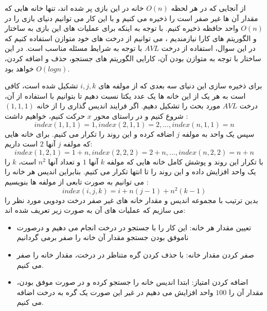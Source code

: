\documentclass[]{article}
\begin{document}
از آنجایی که در هر لحظه $O(n)$ خانه در این بازی پر شده اند،
تنها خانه هایی که مقدار آن ها غیر صفر است را ذخیره می کنیم و با این کار می توانیم
دنیای بازی را در $O(n)$ واحد حافظه ذخیره کنیم.
با توجه به اینکه برای عملیات های این بازی به ساختار و الگوریتم های کارا نیازمندیم ، می توانیم از
درخت های خود متوازن استفاده کنیم که در این سوال، استفاده از درخت $AVL$
با توجه به شرایط مسئله مناسب است.
در این ساختار با توجه به متوازن بودن آن، کارایی الگوریتم های جستجو، حذف و اضافه کردن،
$O(logn)$
خواهد بود.

برای ذخیره سازی این دنیای سه بعدی که از مولفه های $i, j, k$ تشکیل شده است،
کافی است به هر یک از این خانه ها یک عدد یکتا نسبت دهیم تا بتوانیم با استفاده از آن، درخت $AVL$
مورد بحث را تشکیل دهیم.
اگر فرایند اندیس گذاری را از خانه $(1,1,1)$ شروع کنیم و در راستای محور $x$ حرکت کنیم،
خواهیم داشت :
$$
index(1,1,1) = 1, index(2, 1, 1) = 2, ..., index(n, 1, 1) = n
$$
سپس یک واحد به مولفه $j$ اضافه کرده و این روند را تکرار می کنیم.
برای خانه هایی که مولفه $j$ آنها $2$ است داریم:
$$
index(1,2,1) = 1 + n, index(2, 2, 2) = 2 + n, \ldots, index(n, 2, 2) = n + n
$$
با تکرار این روند و پوشش کامل خانه هایی که مولفه $k$ آنها $1$ و تعداد آنها $n^2$ است،
$k$ را یک واحد افزایش داده و این روند را تا انتها تکرار می کنیم.
بنابراین اندیس هر خانه را می توانیم به صورت تابعی از مولفه ها بنویسیم :
$$index(i, j, k) = i + n(j-1) + n^2(k-1)$$
بدین ترتیب با مجموعه اندیس و مقدار خانه های غیر صفر درخت دودویی مورد نظر را می سازیم که عملیات های آن
به صورت زیر تعریف شده اند:
\begin{itemize}
    \item {
        تعیین مقدار هر خانه: این کار را با جستجو در درخت انجام می دهیم و درصورت
        ناموفق بودن جستجو مقدار آن خانه را صفر برمی گردانیم
    }
    \item {
        صفر کردن مقدار خانه:
        با حذف کردن گره متناظر در درخت، مقدار خانه را صفر می کنیم.
    }
    \item {
        اضافه کردن امتیاز:
        ابتدا اندیس خانه را جستجو کرده و در صورت موفق بودن، مقدار آن را $100$
        واحد افزایش می دهیم در غیر این صورت یک گره به درخت اضافه می کنیم.
    }
\end{itemize}
\end{document}
